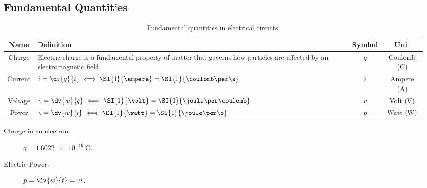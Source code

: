 \documentclass{article}
\begin{document}
\subsection{Fundamental Quantities}
\begingroup
\renewcommand{\arraystretch}{1.5}
\begin{table}[H]
    \centering
    \begin{tabular}{c | >{\centering}p{} | c | c}
        \toprule
        \textbf{Name} & \textbf{Definition}                                                                                                      & \textbf{Symbol}           & \textbf{Unit} \\
        \midrule
        Charge        & Electric charge is a fundamental property of matter that governs how particles are affected by an electromagnetic field.
                      & $q$                                                                                                                      & Coulomb (\unit{\coulomb})                 \\
        \hline
        Current       & $\displaystyle i = \dv{q}{t}\iff\SI{1}{\ampere} = \SI{1}{\coulomb\per\s}$
                      & $i$                                                                                                                      & Ampere (\unit{\ampere})                   \\
        \hline
        Voltage       & $\displaystyle v = \dv{w}{q}\iff\SI{1}{\volt} = \SI{1}{\joule\per\coulomb}$
                      & $v$                                                                                                                      & Volt (\unit{\volt})                       \\
        \hline
        Power         & $\displaystyle p = \dv{w}{t}\iff\SI{1}{\watt} = \SI{1}{\joule\per\s}$
                      & $p$                                                                                                                      & Watt (\unit{\watt})                       \\
        \bottomrule
    \end{tabular}
    \caption{Fundamental quantities in electrical circuits.}
\end{table}
\endgroup
\begin{description}
    \item[Charge in an electron.] $q = \SI{1.6022e-19}{\coulomb}$.
    \item[Electric Power.] $\displaystyle p = \dv{w}{t} = vi$.
\end{description}
\end{document}
